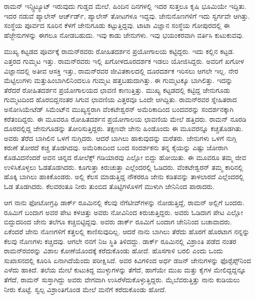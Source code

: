 
ರಾಮನ್ ಇನ್ಸ್ಟಿಟ್ಯೂಟ್ ಇರುವುದು ಗುಡ್ಡದ ಮೇಲೆ. ಹಿಂದಿನ ದಿನಗಳಲ್ಲಿ ಇದರ ಸುತ್ತಲೂ ಕೃಷಿ ಭೂಮಿಯೇ ಇದ್ದಿತು. ಇದರ ನಡುವೆ ಪ್ಯಾಲೇಸ್ ಆರ್ಚ್‌ರ್ಡ್, ಪ್ಯಾಲೇಸ್ ತೋಟಗಳೂ ಇದ್ದವು. ಜೇನುನೊಣಗಳಿಗೆ ಇದು ಸ್ವರ್ಗವೇ ಆಗಿತ್ತು. ಸಂಸ್ಥೆಯ ಪೂರ್ವದ ಸೂರಿನ ಕೆಳಗೆ ಜೇನುಗೂಡು ಕಟ್ಟುತ್ತಿದ್ದವು. ಟಾಟಾ ವಿಜ್ಞಾನ ಸಂಸ್ಥೆಯ ಗೋಪುರದಲ್ಲಿ ಈ ಹೆಜ್ಜೇನುಗಳನ್ನು ಈಗಲೂ ನೋಡಬಹುದು. ಇವು ಕಾಡು ಜೇನುಗಳು. ಇವು ಭಯಂಕರವಾಗಿ ವರ್ತಿಸಿ ಕುಟುಕುವವು.

ಮುಖ್ಯ ಕಟ್ಟಡದ ಪೂರ್ವಕ್ಕೆ ರಾಮನ್‍ರವರು ರೋಹಿತದರ್ಶನ ಪ್ರಯೋಗಾಲಯ ಕಟ್ಟಿದ್ದರು. ಇದು ಕಲ್ಲಿನ ಕಟ್ಟಡ. ಎತ್ತರದ ಗುಮ್ಮಟ ಇತ್ತು. ರಾಮನ್‍ರವರು ಇಲ್ಲಿ ಖಗೋಳದೂರದರ್ಶಕ ಇಡಲು ಯೋಜಿಸಿದ್ದರು. ಅವರಿಗೆ ಖಗೋಳ ವಿಜ್ಞಾನದಲ್ಲಿ ಅತೀವ ಆಸಕ್ತಿ ಇತ್ತು, ರಾಮನ್‍ರವರ ಜೀವಿತಕಾಲದಲ್ಲಿ ದೂರದರ್ಶಕ ಇರಿಸಲು ಆಗಲೇ ಇಲ್ಲ. ನೇರ ಮೆಟ್ಟಿಲುಗಳು ಮತ್ತು\break ಹಿಂಬಾಗಿಲಿನಿಂದಲೂ ಗುಮ್ಮಟ ಹತ್ತಬಹುದಾಗಿತ್ತು. ಈ ಗುಮ್ಮಟಕ್ಕೂ ಬಾಗಿಲಿತ್ತು. ಇದನ್ನು ತೆರೆದರೆ ರೋಹಿತದರ್ಶನ ಪ್ರಯೋಗಾಲಯದ ಛಾವಣಿ ಕಾಣುತ್ತಿತ್ತು. ಮುಖ್ಯ ಕಟ್ಟಡದಲ್ಲಿ ಕಟ್ಟಿದ್ದ ಜೇನುಗೂಡು ಗುಮ್ಮಟದಿಂದ ಹೊರಬಿದ್ದನಂತರ ಸಿಗುವ ಛಾವಣಿಯ ಎತ್ತರವೂ ಒಂದೇ ಆಗಿದ್ದಿತು. ರಾಮನ್‍ರವರ ಸ್ನೇಹಿತರಾದ ಅಸೋಸಿಯೇಟೆಡ್ ಸಿಮೆಂಟ್‍ನ ಮುಖ್ಯಸ್ಥರಾಗಿ ವೆಂಕಟೇಶ್ವರನ್ ಅಮೆರಿಕಾದಿಂದ ಬಂದವರನ್ನು ಸಂದರ್ಶನಕ್ಕಾಗಿ ಕರೆತಂದಿದ್ದರು. ಈ ಮೂವರೂ ರೋಹಿತದರ್ಶನ ಪ್ರಯೋಗಾಲಯ ಛಾವಣಿಯ ಮೇಲೆ ಹತ್ತಿದರು. ರಾಮನ್ ನೂರಡಿ ದೂರದಲ್ಲಿದ್ದ ಜೇನುಗೂಡನ್ನು ತೋರಿಸುತ್ತಿದ್ದರು. ತಕ್ಷಣವೇ ಜೇನು ಹಿಂಡೊಂದು ಈ ಮೂವರನ್ನೂ ಕಚ್ಚತೊಡಗಿತು. ಅವರು ತೆರೆದ ಬಾಗಿಲಿನ ಒಳಗೆ ನುಗ್ಗಿದರು. ಆದರೆ ಬಾಗಿಲು ಹಾಕುವುದನ್ನು ಮರೆತರು. ಜೇನುಗಳು ಒಳಗೆ ನುಗ್ಗಿ ಕರುಣೆ ತೋರದೆ ಕಚ್ಚ ತೊಡಗಿದವು. ಅಮೆರಿಕಾದಿಂದ ಬಂದ ಸಂದರ್ಶಕನು ತನ್ನ ಕೈಯನ್ನು ಎಷ್ಟು ಜೋರಾಗಿ ಕೊಡವಿದನೆಂದರೆ ಅವನ ಚಿನ್ನದ ರೋಲೆಕ್ಸ್ ಗಡಿಯಾರವು ಎಲ್ಲೋ ಬಿದ್ದು ಹೋಯಿತು. ಈ ಮೂವರೂ ತಮ್ಮ ಜೀವ ಉಳಿಸಿಕೊಳ್ಳಲು ಓಡತೊಡಗಿದರು. ಕೂಗುತ್ತಾ ಕಿರುಚುತ್ತಾ ಎಲ್ಲೆಂದರಲ್ಲಿ ಓಡಿದರು. ವೆಂಕಟೇಶ್ವರನ್ ತಮ್ಮ ಕಾರಿನಲ್ಲಿ ಹೊಕ್ಕಿ ಬಾಗಿಲು ಹಾಕಿಕೊಂಡರು. ಅಲ್ಲಿ ಕೆಲಸ ಮಾಡುತ್ತಿದ್ದ ನೌಕರರೂ ಜೇನು ಕಡಿತವನ್ನು ತಾಳಲಾರದೆ ಎಲ್ಲೆಂದರಲ್ಲಿ ಓಡ ತೊಡಗಿದರು. ಕೆಲವರಂತೂ ನೀರು ತುಂಬಿದ ತೊಟ್ಟಿಗಳೊಳಗೆ ಮುಳುಗಿ ಜೇನಿನಿಂದ ಪಾರಾದರು.

ಆಗ ನಾನು ಫೋಟೋಗ್ರಫಿ ಡಾರ್ಕ್ ರೂಮಿನಲ್ಲಿ ಕೆಲವು ನೆಗೆಟೀವ್‍ಗಳನ್ನು ನೋಡುತ್ತಿದ್ದೆ, ರಾಮನ್ ಅಲ್ಲಿಗೆ ಬಂದರು. ರೂಮಿಗೆ ಬಂದಾಗ ಅವರ ಪೇಟ ಕಳಚಿತ್ತು ಅವರು ನೋವಿನಿಂದ ಕಿರುಚುತ್ತಿದ್ದರು. ಅವರು ಓಡಿದಾಗ ಪೇಟ ಎಲ್ಲೋ ಬಿದ್ದುದರಿಂದ ಜೇನು ತಲೆಗೂ ಕಚ್ಚಿಬಿಟ್ಟಿದ್ದವು. ಅವರು ಡಾರ್ಕ್ ರೂಮಿಗೆ ಬಂದಾಗ ಜೇನಿನಿಂದ ಬಚಾವಾದರು. ಏಕೆಂದರೆ ಜೇನು ನೊಣಗಳಿಗೆ ಕತ್ತಲಲ್ಲಿ ಕಾಣಿಸುವುದಿಲ್ಲ. ಆದರೆ ನಾನು ಬಾಗಿಲು ತೆರೆದು ಹೊರಗೆ ಹೊರಟಾಗ ನನ್ನನ್ನು ಕೆಲವು ನೊಣಗಳು ಕಚ್ಚಿದವು. ಆಗಲೇ ನನಗೆ ನಿಜ ಸ್ಥಿತಿ ತಿಳಿದದ್ದು. ಡಾರ್ಕ್ ರೂಮಿನಲ್ಲಿ ವಿಶ್ರಾಂತಿ ಪಡೆದ ನಂತರ ರಾಮನ್‍ರವರನ್ನು ವಿಶಾಲ ಕೋಣೆಯೊಂದಕ್ಕೆ ಕರೆದುಕೊಂಡು ಹೋದೆ. ಹೊಸಗಾಳಿ ಬರಲಿ ಎಂದು ಒಂದು ಸುಖಾಸನದಲ್ಲಿ ಕೂರಿಸಿ ಏನಾಗಿದೆಯೆಂದು ಪರೀಕ್ಷಿಸಿದೆ. ಅವರ ಕಿವಿಗಳಿಂದ ಅರ್ಧ ಡಜನ್ ಜೇನುಗಳನ್ನು ಫೊರ್‍ಸೆಪ್ಸ್‌ನಿಂದ ಎಳೆದು ಹಾಕಿದೆ. ತಲೆಯ ಮೇಲೆ ಕುಟುಕಿದ್ದ ಮುಳ್ಳುಗಳನ್ನು ತೆಗೆದೆ, ಹಾಗೆಯೇ ಮುಖ ಮತ್ತು ಕೈಗಳ ಮೇಲಿದ್ದದ್ದನ್ನೂ ತೆಗೆದೆ, ರಾಮನ್ ಸುಸ್ತಾಗಿದ್ದು ಅವರು ವೇಗವಾಗಿ ಉಸಿರೆಳೆದುಕೊಳ್ಳುತ್ತಿದ್ದರು. ಮೈಬೆವರುತ್ತಿತ್ತು ನಾನು ಕುಡಿಯಲು ನೀರು ಕೊಟ್ಟೆ. ಸ್ವಲ್ಪ ವಿಶ್ರಾಂತಿಗೊಂಡ ಮೇಲೆ ಮನೆಗೆ ಕರೆದುಕೊಂಡು ಹೋದೆ.

